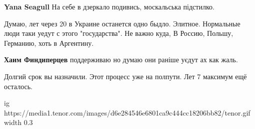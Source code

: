 \begin{itemize}
\begin{itemize}
\textbf{Yana Seagull} На себе в дзеркало подивись, москальська підстилко.
\end{itemize}



Думаю, лет через 20 в Украине останется одно быдло. Элитное. Нормальные люди
таки уедут с этого "государства". Не важно куда, В Россию, Польшу, Германию,
хоть в Аргентину.

\begin{itemize}

\textbf{Хаим Финдиперцев} поддерживаю но думаю они раніше уєдут ах как жаль.


Долгий срок вы назначили. Этот процесс уже на полпути. Лет 7 максимум ещё осталось.

\end{itemize}


\ifcmt
  ig https://media1.tenor.com/images/d6e284546e6801ca9c444cc18206bb82/tenor.gif
  width 0.3
\fi

\end{itemize}

